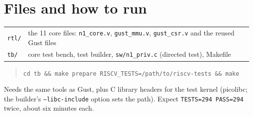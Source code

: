 \documentclass[10pt,a4paper]{article}
\newcommand{\code}[1]{\texttt{#1}}
\begin{document}
\section{Files and how to run}
\begin{center}\small\begin{tabular}{@{}ll@{}}\toprule
\code{rtl/} & the 11 core files: \code{n1\_core.v}, \code{gust\_mmu.v}, \code{gust\_csr.v} and the reused Gust files \\
\code{tb/} & core test bench, test builder, \code{sw/n1\_priv.c} (directed test), Makefile \\\bottomrule
\end{tabular}\end{center}
\begin{quote}\small\code{cd tb \&\& make prepare RISCV\_TESTS=/path/to/riscv-tests \&\& make}\end{quote}
Needs the same tools as Gust, plus C library headers for the test kernel (picolibc; the builder's \code{--libc-include} option sets the path). Expect \code{TESTS=294 PASS=294} twice, about six minutes each.
\end{document}
